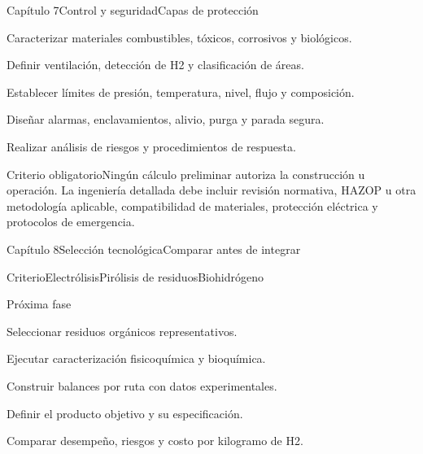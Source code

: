 \documentclass{../plantilla/hvtbook}
\begin{document}
\begin{HVTPage}{Capítulo 7}{Control y seguridad}{Capas de protección}
\begin{HVTSteps}\item Caracterizar materiales combustibles, tóxicos, corrosivos y biológicos. \item Definir ventilación, detección de H2 y clasificación de áreas. \item Establecer límites de presión, temperatura, nivel, flujo y composición. \item Diseñar alarmas, enclavamientos, alivio, purga y parada segura. \item Realizar análisis de riesgos y procedimientos de respuesta.\end{HVTSteps}
\begin{HVTWarning}{Criterio obligatorio}Ningún cálculo preliminar autoriza la construcción u operación. La ingeniería detallada debe incluir revisión normativa, HAZOP u otra metodología aplicable, compatibilidad de materiales, protección eléctrica y protocolos de emergencia.\end{HVTWarning}
\end{HVTPage}

\begin{HVTPage}{Capítulo 8}{Selección tecnológica}{Comparar antes de integrar}
\begin{HVTTableFour}{Criterio}{Electrólisis}{Pirólisis de residuos}{Biohidrógeno}
\end{HVTTableFour}
\begin{HVTTask}{Próxima fase}\item Seleccionar residuos orgánicos representativos. \item Ejecutar caracterización fisicoquímica y bioquímica. \item Construir balances por ruta con datos experimentales. \item Definir el producto objetivo y su especificación. \item Comparar desempeño, riesgos y costo por kilogramo de H2.\end{HVTTask}
\end{HVTPage}
\end{document}
